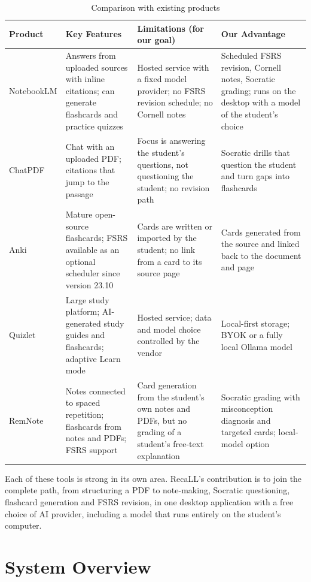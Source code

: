 \begin{table}[htbp]
\centering
\caption{Comparison with existing products}\label{tab:competitors}
\small
\begin{tabularx}{\textwidth}{@{}>{\raggedright\arraybackslash}p{2.0cm} X X X@{}}
\toprule
\textbf{Product} & \textbf{Key Features} & \textbf{Limitations (for our goal)} & \textbf{Our Advantage}\\
\midrule
NotebookLM & Answers from uploaded sources with inline citations; can generate
flashcards and practice quizzes & Hosted service with a fixed model provider; no FSRS
revision schedule; no Cornell notes & Scheduled FSRS revision, Cornell notes, Socratic
grading; runs on the desktop with a model of the student's choice\\
\addlinespace
ChatPDF & Chat with an uploaded PDF; citations that jump to the passage & Focus is
answering the student's questions, not questioning the student; no revision path &
Socratic drills that question the student and turn gaps into flashcards\\
\addlinespace
Anki & Mature open-source flashcards; FSRS available as an optional scheduler since
version 23.10 & Cards are written or imported by the student; no link from a card to its
source page & Cards generated from the source and linked back to the document and page\\
\addlinespace
Quizlet & Large study platform; AI-generated study guides and flashcards; adaptive Learn
mode & Hosted service; data and model choice controlled by the vendor & Local-first
storage; BYOK or a fully local Ollama model\\
\addlinespace
RemNote & Notes connected to spaced repetition; flashcards from notes and PDFs; FSRS
support & Card generation from the student's own notes and PDFs, but no grading of a
student's free-text explanation & Socratic grading with misconception diagnosis and
targeted cards; local-model option\\
\bottomrule
\end{tabularx}
\end{table}

Each of these tools is strong in its own area. RecaLL's contribution is to join the
complete path, from structuring a PDF to note-making, Socratic questioning, flashcard
generation and FSRS revision, in one desktop application with a free choice of AI
provider, including a model that runs entirely on the student's computer.

\section{System Overview}

